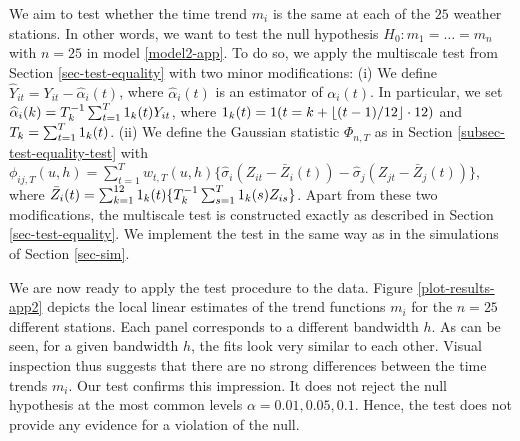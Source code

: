 We aim to test whether the time trend $m_i$ is the same at each of the $25$ weather stations. In other words, we want to test the null hypothesis $H_0: m_1 = \ldots = m_n$ with $n = 25$ in model \eqref{model2-app}. To do so, we apply the multiscale test from Section \ref{sec-test-equality} with two minor modifications: (i) We define $\widehat{Y}_{it} = Y_{it} - \widehat{\alpha}_i(t)$, where $\widehat{\alpha}_i(t)$ is an estimator of $\alpha_i(t)$. In particular, we set $\widehat{\alpha}_i(k) = T_k^{-1} \sum_{t = 1}^T 1_k(t) Y_{it}$, where $1_k(t) = 1(t = k + \lfloor (t-1)/12 \rfloor \cdot 12)$ and $T_k = \sum_{t=1}^T 1_k(t)$. (ii) We define the Gaussian statistic $\Phi_{n,T}$ as in Section \ref{subsec-test-equality-test} with $\phi_{ij,T}(u,h) = \sum_{t=1}^T w_{t,T}(u,h) \{ \widehat{\sigma}_i (Z_{it} - \bar{Z}_i(t)) - \widehat{\sigma}_j (Z_{jt} - \bar{Z}_j(t))\}$, where $\bar{Z}_i(t) = \sum_{k=1}^{12} 1_k(t) \{ T_k^{-1} \sum_{s = 1}^T 1_k(s) Z_{is} \}$. Apart from these two modifications, the multiscale test is constructed exactly as described in Section \ref{sec-test-equality}. We implement the test in the same way as in the simulations of Section \ref{sec-sim}. 


We are now ready to apply the test procedure to the data. Figure \ref{plot-results-app2} depicts the local linear estimates of the trend functions $m_i$ for the $n=25$ different stations. Each panel corresponds to a different bandwidth $h$. As can be seen, for a given bandwidth $h$, the fits look very similar to each other. Visual inspection thus suggests that there are no strong differences between the time trends $m_i$. Our test confirms this impression. It does not reject the null hypothesis at the most common levels $\alpha = 0.01, 0.05, 0.1$. Hence, the test does not provide any evidence for a violation of the null. %

